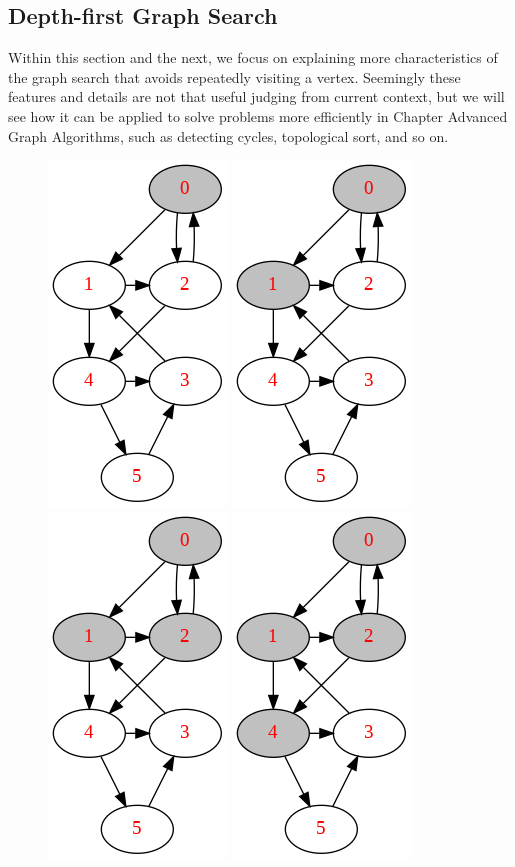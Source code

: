 \documentclass[../main.tex]{subfiles}
\begin{document}
\subsection{Depth-first Graph Search}
Within this section and the next, we focus on explaining more characteristics of the graph search that avoids repeatedly visiting a vertex. 
Seemingly these features and details are not that useful judging from current context, but we will see how it can be applied to solve problems more efficiently in Chapter Advanced Graph Algorithms, such as detecting cycles, topological sort, and so on.
\begin{figure}[!ht]
    \centering
    \includegraphics[width=0.2\columnwidth]{fig/depth_first_graph_search_process0.png}
    \includegraphics[width=0.2\columnwidth]{fig/depth_first_graph_search_process1.png}
    \includegraphics[width=0.2\columnwidth]{fig/depth_first_graph_search_process2.png}
    \includegraphics[width=0.2\columnwidth]{fig/depth_first_graph_search_process3.png}
    

\end{figure}
\end{document}
